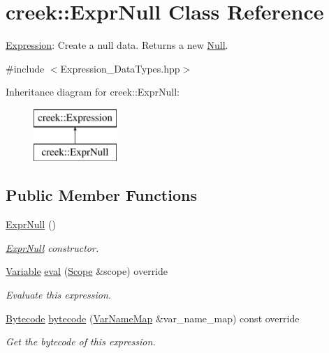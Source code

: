 \hypertarget{classcreek_1_1_expr_null}{}\section{creek\+:\+:Expr\+Null Class Reference}
\label{classcreek_1_1_expr_null}


\hyperlink{classcreek_1_1_expression}{Expression}\+: Create a null data. Returns a new {\ttfamily \hyperlink{classcreek_1_1_null}{Null}}.  




{\ttfamily \#include $<$Expression\+\_\+\+Data\+Types.\+hpp$>$}

Inheritance diagram for creek\+:\+:Expr\+Null\+:\begin{figure}[H]
\begin{center}
\leavevmode
\includegraphics[height=2.000000cm]{classcreek_1_1_expr_null}
\end{center}
\end{figure}
\subsection*{Public Member Functions}
\begin{DoxyCompactItemize}
\item 
\hyperlink{classcreek_1_1_expr_null_a0a25244d6dd8a0c4eeab0ae1400cf78f}{Expr\+Null} ()\hypertarget{classcreek_1_1_expr_null_a0a25244d6dd8a0c4eeab0ae1400cf78f}{}\label{classcreek_1_1_expr_null_a0a25244d6dd8a0c4eeab0ae1400cf78f}

\begin{DoxyCompactList}\small\item\em {\ttfamily \hyperlink{classcreek_1_1_expr_null}{Expr\+Null}} constructor. \end{DoxyCompactList}\item 
\hyperlink{classcreek_1_1_variable}{Variable} \hyperlink{classcreek_1_1_expr_null_a8f9e7c9e1e635b148936627bf33018a7}{eval} (\hyperlink{classcreek_1_1_scope}{Scope} \&scope) override
\begin{DoxyCompactList}\small\item\em Evaluate this expression. \end{DoxyCompactList}\item 
\hyperlink{classcreek_1_1_bytecode}{Bytecode} \hyperlink{classcreek_1_1_expr_null_a6474da5ce693c609f5e8ba37a543f5ff}{bytecode} (\hyperlink{classcreek_1_1_var_name_map}{Var\+Name\+Map} \&var\+\_\+name\+\_\+map) const  override\hypertarget{classcreek_1_1_expr_null_a6474da5ce693c609f5e8ba37a543f5ff}{}\label{classcreek_1_1_expr_null_a6474da5ce693c609f5e8ba37a543f5ff}

\begin{DoxyCompactList}\small\item\em Get the bytecode of this expression. \end{DoxyCompactList}\end{DoxyCompactItemize}


